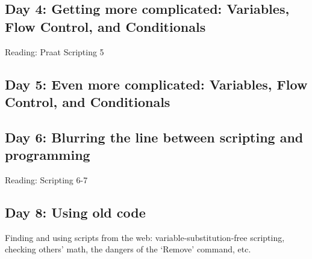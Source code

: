 \documentclass [12pt]{article}
\begin{document}
\subsection*{Day 4: Getting more complicated: Variables, Flow Control, and Conditionals}
Reading: Praat Scripting 5

\subsection*{Day 5: Even more complicated: Variables, Flow Control, and Conditionals}


\subsection*{Day 6: Blurring the line between scripting and programming}
Reading: Scripting 6-7

\subsection*{Day 8: Using old code}
Finding and using scripts from the web: variable-substitution-free scripting, checking others' math, the dangers of the `Remove' command, etc.
\end{document}
